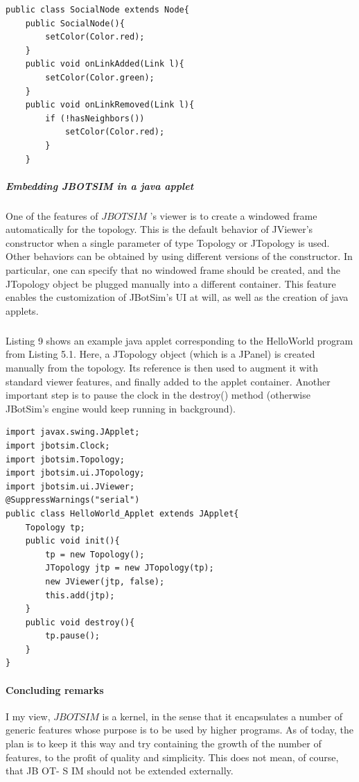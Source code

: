 \begin{lstlisting}[caption=Example of graph-based algorithm, captionpos=b]
public class SocialNode extends Node{
	public SocialNode(){
		setColor(Color.red);
	}
	public void onLinkAdded(Link l){
		setColor(Color.green);
	}
	public void onLinkRemoved(Link l){
		if (!hasNeighbors())
			setColor(Color.red);
		}
	}
\end{lstlisting}
\subparagraph{Embedding JBOTSIM in a java applet}One of the features of  $JBOTSIM$ ’s viewer is to create a windowed frame automatically for the topology. This is the default behavior of JViewer’s constructor when a single parameter of type Topology or JTopology is used. Other behaviors can be obtained by using different versions of the constructor. In particular, one can specify that no windowed frame should be created, and the JTopology object be plugged manually into a different container. This feature enables the customization of JBotSim’s UI at will, as well as the creation of java applets.
\subparagraph{}Listing 9 shows an example java applet corresponding to the HelloWorld program from Listing 5.1. Here, a JTopology object (which is a JPanel) is created manually from the topology. Its reference is then used to augment it with standard viewer features, and finally added to the applet container. Another important step is to pause the clock in the destroy() method (otherwise JBotSim’s engine would keep running in background).
\newpage
\begin{lstlisting}[caption=Embedding a $JBOTSIM$ demo into a java applet, captionpos=b]
import javax.swing.JApplet;
import jbotsim.Clock;
import jbotsim.Topology;
import jbotsim.ui.JTopology;
import jbotsim.ui.JViewer;
@SuppressWarnings("serial")
public class HelloWorld_Applet extends JApplet{
	Topology tp;
	public void init(){
		tp = new Topology();
		JTopology jtp = new JTopology(tp);
		new JViewer(jtp, false);
		this.add(jtp);
	}
	public void destroy(){
		tp.pause();
	}
}
\end{lstlisting}

\paragraph{Concluding remarks}I my view, $JBOTSIM$ is a kernel, in the sense that it encapsulates a number of generic features whose purpose is to be used by higher programs. As of today, the plan is to keep it this way and try containing the growth of the number of features, to the profit of quality and simplicity. This does not mean, of course, that JB OT- S IM should not be extended externally.
